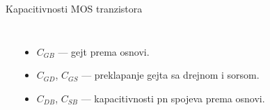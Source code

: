 \begin{frame}[label=09_3-s003]{Kapacitivnosti MOS tranzistora}
\begin{columns}[c,onlytextwidth]
\begin{center}

\end{center}
\begin{itemize}
\item $C_{GB}$ — gejt prema osnovi.
\item $C_{GD}$, $C_{GS}$ — preklapanje gejta sa drejnom i sorsom.
\item $C_{DB}$, $C_{SB}$ — kapacitivnosti pn spojeva prema osnovi.
\end{itemize}
\begin{center}

\end{center}
\end{columns}
\end{frame}
